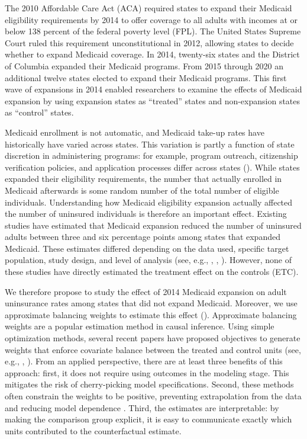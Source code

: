 The 2010 Affordable Care Act (ACA) required states to expand their Medicaid eligibility requirements by 2014 to offer coverage to all adults with incomes at or below 138 percent of the federal poverty level (FPL). The United States Supreme Court ruled this requirement unconstitutional in 2012, allowing states to decide whether to expand Medicaid coverage. In 2014, twenty-six states and the District of Columbia expanded their Medicaid programs. From 2015 through 2020 an additional twelve states elected to expand their Medicaid programs. This first wave of expansions in 2014 enabled researchers to examine the effects of Medicaid expansion by using expansion states as ``treated'' states and non-expansion states as ``control'' states. 

Medicaid enrollment is not automatic, and Medicaid take-up rates have historically have varied across states. This variation is partly a function of state discretion in administering programs: for example, program outreach, citizenship verification policies, and application processes differ across states (\cite{courtemanche2017early}). While states expanded their eligibility requirements, the number that actually enrolled in Medicaid afterwards is some random number of the total number of eligible individuals. Understanding how Medicaid eligibility expansion actually affected the number of uninsured individuals is therefore an important effect. Existing studies have estimated that Medicaid expansion reduced the number of uninsured adults between three and six percentage points among states that expanded Medicaid. These estimates differed depending on the data used, specific target population, study design, and level of analysis (see, e.g., \cite{kaestner2017effects}, \cite{courtemanche2017early}, \cite{frean2017premium}). However, none of these studies have directly estimated the treatment effect on the controls (ETC). 

We therefore propose to study the effect of 2014 Medicaid expansion on adult uninsurance rates among states that did not expand Medicaid. Moreover, we use approximate balancing weights to estimate this effect (\cite{wang2017minimal}). Approximate balancing weights are a popular estimation method in causal inference. Using simple optimization methods, several recent papers have proposed objectives to generate weights that enforce covariate balance between the treated and control units (see, e.g., \cite{abadie2010synthetic}, \cite{zubizarreta2015stable}). From an applied perspective, there are at least three benefits of this approach: first, it does not require using outcomes in the modeling stage. This mitigates the risk of cherry-picking model specifications. Second, these methods often constrain the weights to be positive, preventing extrapolation from the data and reducing model dependence \cite{zubizarreta2015stable}. Third, the estimates are interpretable: by making the comparison group explicit, it is easy to communicate exactly which units contributed to the counterfactual estimate.


